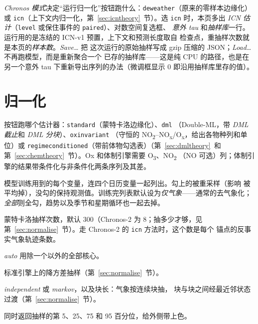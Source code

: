 \documentclass[11pt]{ctexrep}
\newcommand{\nosep}{\setlength{\itemsep}{0pt}\setlength{\parskip}{0pt}\setlength{\topsep}{2pt}}
\newcommand{\codeunderscore}{\textunderscore\allowbreak}
\newcommand{\code}[1]{\texttt{\let\_\codeunderscore #1}}
\newcommand{\NOtwo}{NO\textsubscript{2}}
\newcommand{\NOx}{NO\textsubscript{x}}
\begin{document}
\emph{Chronos 模式}决定“运行归一化”按钮跑什么：\code{deweather}（原来的零样本边缘化）或
\code{icn}（上下文内归一化，第~\ref{sec:icntheory}~节）。选 \code{icn} 时，本页多出
\emph{ICN 估计}（\code{level} 或保住事件的 \code{paired}）、对数空间复选框、
\emph{意外 tau} 和\emph{抽样库}一行。运行用的是冻结的 ICN-v1 预置，上下文和预测长度取自
检查点，重抽样次数就是本页的\emph{样本数}。\emph{Save\dots} 把
这次运行的原始抽样写成 gzip 压缩的 JSON；\emph{Load\dots} 不再跑模型，而是重新聚合一个
已存的抽样库——这是纯 CPU 的路径，也是在另一个意外 tau 下重新导出序列的办法（微调框显示
0 即沿用抽样库里存的值）。

\chapter{归一化}\label{ch:normalise}

\begin{description}\nosep
  \item[引擎] 按钮跑哪个估计器：\code{standard}（蒙特卡洛边缘化）、\code{dml}
        （Double-ML，带 \emph{DML 截止}和 \emph{DML 分块}）、\code{ox\_invariant}
        （守恒的 \NOtwo{}--\NOx{}/O\textsubscript{x}，给出各物种列和单位）或
        \code{regime\_conditioned}（带前体物勾选表）（第~\ref{sec:dmltheory}~和
        第~\ref{sec:chemtheory}~节）。Ox 和体制引擎需要 O\textsubscript{3}、\NOtwo{}
        （NO 可选）列；体制引擎的结果带条件化与非条件化两条序列及其差。
  \item[重采样变量] 模型训练用到的每个变量，连四个日历变量一起列出。勾上的被重采样（影响
        被平均掉），没勾的保持观测值。训练完列表默认设为\emph{仅气象}——通常的去气象化；
        \emph{全部}则全勾，趋势以及季节和星期循环也一起去掉。
  \item[样本数] 蒙特卡洛抽样次数，默认 300（Chronos-2 为 8；抽多少才够，见
        第~\ref{sec:normalise}~节）。走 Chronos-2 的 \code{icn} 方法时，这个数是每个
        锚点的反事实气象轨迹条数。
  \item[CPU 核心数] \emph{auto} 用除一个以外的全部核心。
  \item[控制变量] 标准引擎上的降方差抽样（第~\ref{sec:normalise}~节）。
  \item[分块重采样] \emph{independent} 或 \emph{markov}，以及块长：气象按连续块抽，
        块与块之间经最近邻状态过渡（第~\ref{sec:normalise}~节）。
  \item[5--95\,\% 分位数带] 同时返回抽样的第 5、25、75 和 95 百分位，给外侧带上色。
\end{description}
\end{document}
